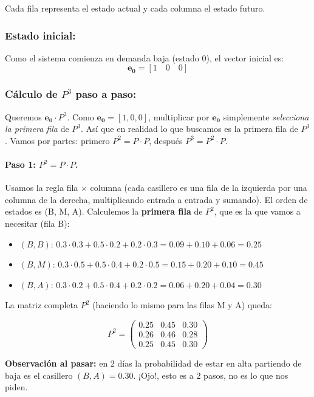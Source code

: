 \documentclass[a4paper,11pt]{article}
\begin{document}
Cada fila representa el estado actual y cada columna el estado futuro.

\subsubsection{Estado inicial:}

Como el sistema comienza en demanda baja (estado 0), el vector inicial es:
\[
\mathbf{e_0} = [1 \quad 0 \quad 0]
\]

\subsubsection{Cálculo de $P^3$ paso a paso:}

Queremos $\mathbf{e_0} \cdot P^3$. Como $\mathbf{e_0} = [1, 0, 0]$, multiplicar por $\mathbf{e_0}$ simplemente \emph{selecciona la primera fila} de $P^3$. Así que en realidad lo que buscamos es la primera fila de $P^3$. Vamos por partes: primero $P^2 = P \cdot P$, después $P^3 = P^2 \cdot P$.

\paragraph{Paso 1: $P^2 = P \cdot P$.} Usamos la regla fila $\times$ columna (cada casillero es una fila de la izquierda por una columna de la derecha, multiplicando entrada a entrada y sumando). El orden de estados es (B, M, A). Calculemos la \textbf{primera fila} de $P^2$, que es la que vamos a necesitar (fila B):

\begin{itemize}
    \item $(B,B)$: $0.3 \cdot 0.3 + 0.5 \cdot 0.2 + 0.2 \cdot 0.3 = 0.09 + 0.10 + 0.06 = 0.25$
    \item $(B,M)$: $0.3 \cdot 0.5 + 0.5 \cdot 0.4 + 0.2 \cdot 0.5 = 0.15 + 0.20 + 0.10 = 0.45$
    \item $(B,A)$: $0.3 \cdot 0.2 + 0.5 \cdot 0.4 + 0.2 \cdot 0.2 = 0.06 + 0.20 + 0.04 = 0.30$
\end{itemize}

La matriz completa $P^2$ (haciendo lo mismo para las filas M y A) queda:

\[P^2 = \begin{pmatrix}
0.25 & 0.45 & 0.30 \\
0.26 & 0.46 & 0.28 \\
0.25 & 0.45 & 0.30
\end{pmatrix}\]

\textbf{Observación al pasar:} en 2 días la probabilidad de estar en alta partiendo de baja es el casillero $(B,A) = 0.30$. ¡Ojo!, esto es a 2 pasos, no es lo que nos piden.
\end{document}
